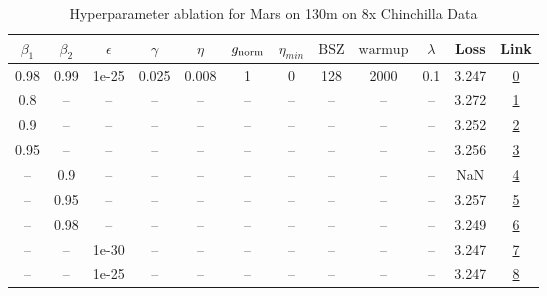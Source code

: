 \begin{table}[H]
\centering
\caption{Hyperparameter ablation for Mars on 130m on 8x Chinchilla Data}
\label{tab:ablation_mars_130m_on_8x_chinchilla_data}
\begin{tabular}{cccccccccccc}
\toprule
$\beta_1$ & $\beta_2$ & $\epsilon$ & $\gamma$ & $\eta$ & $g_{\mathrm{norm}}$ & $\eta_{min}$ & $\mathrm{BSZ}$ & $\mathrm{warmup}$ & $\lambda$ & Loss & Link \\
\midrule
0.98 & 0.99 & 1e-25 & 0.025 & 0.008 & 1 & 0 & 128 & 2000 & 0.1 & 3.247 & \href{https://wandb.ai/marin-community/optimizer-scaling/runs/sweep-130m-21B-marse0bd33lr0.008-wd0.1-minlr0-warmup2000-b10.98--8e8f56}{0} \\
\midrule
0.8 & -- & -- & -- & -- & -- & -- & -- & -- & -- & 3.272 & \href{https://wandb.ai/marin-community/optimizer-scaling/runs/sweep-130m-21B-marsf4b9a3lr0.008-wd0.1-minlr0-warmup2000-b10.8-b-7720d7}{1} \\
0.9 & -- & -- & -- & -- & -- & -- & -- & -- & -- & 3.252 & \href{https://wandb.ai/marin-community/optimizer-scaling/runs/sweep-130m-21B-marsa14b1flr0.008-wd0.1-minlr0-warmup2000-b10.9-b-3cf5ea}{2} \\
0.95 & -- & -- & -- & -- & -- & -- & -- & -- & -- & 3.256 & \href{https://wandb.ai/marin-community/optimizer-scaling/runs/sweep-130m-21B-marsa2ff9clr0.008-wd0.1-minlr0-warmup2000-b10.95--2b9b91}{3} \\
-- & 0.9 & -- & -- & -- & -- & -- & -- & -- & -- & NaN & \href{https://wandb.ai/marin-community/optimizer-scaling/runs/sweep-130m-21B-marsbd2446lr0.008-wd0.1-minlr0-warmup2000-b10.98--91ca7d}{4} \\
-- & 0.95 & -- & -- & -- & -- & -- & -- & -- & -- & 3.257 & \href{https://wandb.ai/marin-community/optimizer-scaling/runs/sweep-130m-21B-mars958a5alr0.008-wd0.1-minlr0-warmup2000-b10.98--43c96f}{5} \\
-- & 0.98 & -- & -- & -- & -- & -- & -- & -- & -- & 3.249 & \href{https://wandb.ai/marin-community/optimizer-scaling/runs/sweep-130m-21B-mars10209dlr0.008-wd0.1-minlr0-warmup2000-b10.98--beb8d7}{6} \\
-- & -- & 1e-30 & -- & -- & -- & -- & -- & -- & -- & 3.247 & \href{https://wandb.ai/marin-community/optimizer-scaling/runs/sweep-130m-21B-marse0bd33lr0.008-wd0.1-minlr0-warmup2000-b10.98--8e8f56}{7} \\
-- & -- & 1e-25 & -- & -- & -- & -- & -- & -- & -- & 3.247 & \href{https://wandb.ai/marin-community/optimizer-scaling/runs/sweep-130m-21B-marse0bd33lr0.008-wd0.1-minlr0-warmup2000-b10.98--8e8f56}{8} \\

\end{tabular}
\end{table}
